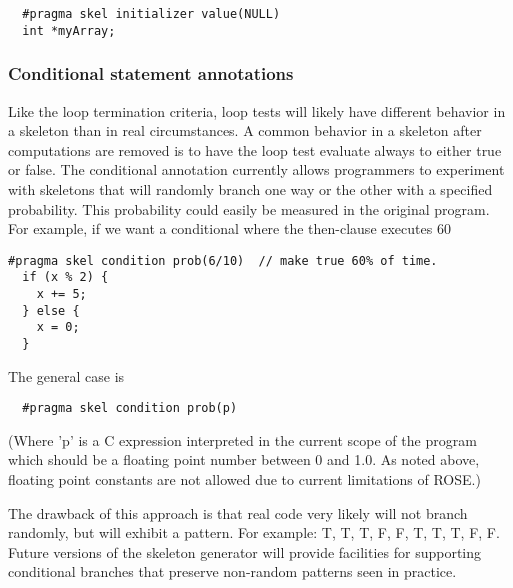 \begin{verbatim}
  #pragma skel initializer value(NULL)
  int *myArray;
\end{verbatim}

\subsubsection{Conditional statement annotations}

Like the loop termination criteria, loop tests will likely have
different behavior in a skeleton than in real circumstances.  A common
behavior in a skeleton after computations are removed is to have the
loop test evaluate always to either true or false.  The conditional
annotation currently allows programmers to experiment with skeletons
that will randomly branch one way or the other with a specified
probability.  This probability could easily be measured in the
original program.  For example, if we want a conditional where the
then-clause executes 60%

\begin{verbatim}
#pragma skel condition prob(6/10)  // make true 60% of time.
  if (x % 2) {
    x += 5;
  } else {
    x = 0;
  }
\end{verbatim}

The general case is

\begin{verbatim}
  #pragma skel condition prob(p)
\end{verbatim}

(Where 'p' is a C expression interpreted in the current scope of the program
which should be a floating point number between 0 and 1.0.  As noted above,
floating point constants are not allowed due to current limitations of
ROSE.)

The drawback of this approach is that real code very likely will not
branch randomly, but will exhibit a pattern.  For example: T, T, T, F,
F, T, T, T, F, F.  Future versions of the skeleton generator will
provide facilities for supporting conditional branches that preserve
non-random patterns seen in practice.
